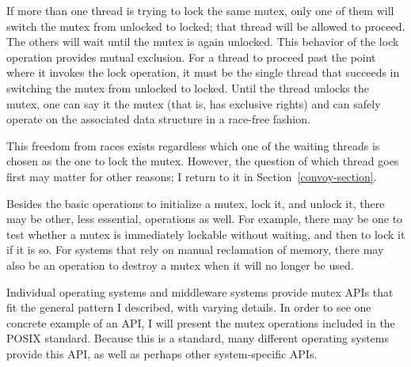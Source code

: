 If more than one thread is trying to lock the same
mutex, only one of them will switch the mutex from unlocked to locked;
that thread will be allowed to proceed.  The others will wait until
the mutex is again unlocked.  This behavior of the lock operation
provides mutual exclusion.  For a thread to proceed past the point
where it invokes the lock operation, it must be the single thread that
succeeds in switching the mutex from unlocked to locked.  Until the
thread unlocks the mutex, one can say it  the mutex (that is, has
exclusive rights) and can safely operate on the associated data
structure in a race-free fashion.

This freedom from races exists regardless which one of the waiting
threads is chosen as the one to lock the mutex.  However, the question of
which thread goes first may matter for other reasons; I return to it
in Section~\ref{convoy-section}.

Besides the basic operations to initialize a mutex, lock it, and
unlock it, there may be other, less essential, operations as well.
For example, there may be one to test whether a mutex is immediately
lockable without waiting, and then to lock it if it is so.  For systems that
rely on manual reclamation of memory, there may also be an operation
to destroy a mutex when it will no longer be used.

Individual operating systems and middleware systems provide mutex APIs
that fit the general pattern I described, with varying details.
In order to see one concrete example of an API, I will present the
mutex operations included in the POSIX standard.  Because this is a
standard, many different operating systems provide this API, as well
as perhaps other system-specific APIs.

